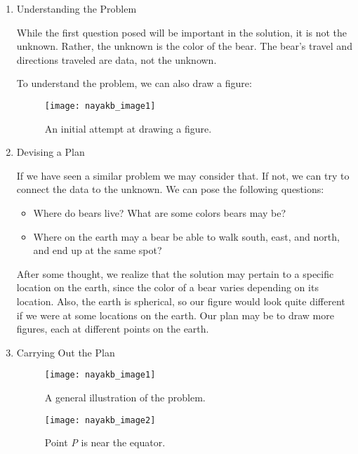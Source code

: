 \begin{enumerate}
   \item Understanding the Problem
  
   While the first question posed will be important in the solution, it is not the unknown. Rather, the unknown is the color of the bear. The bear’s travel and directions traveled are data, not the unknown.
   
   To understand the problem, we can also draw a figure:
   
   \vspace{1cm}
   
   \renewcommand{\thefigure}{1}
   \begin{figure}[htp]
    \centering
    \begin{minipage}{6cm}
    \texttt{[image: nayakb\_image1]}
    \caption{An initial attempt at drawing a figure.}
    \label{fig:1}
    \end{minipage}
\end{figure}

\pagebreak
   \item Devising a Plan
   
   If we have seen a similar problem we may consider that. If not, we can try to connect the data to the unknown. We can pose the following questions:
   
   \begin{itemize}
     \item Where do bears live? What are some colors bears may be?
     \item Where on the earth may a bear be able to walk south, east, and north, and end up at the same spot?
   \end{itemize}
   
   After some thought, we realize that the solution may pertain to a specific location on the earth, since the color of a bear varies depending on its location. Also, the earth is spherical, so our figure would look quite different if we were at some locations on the earth. Our plan may be to draw more figures, each at different points on the earth.
   
   \item Carrying Out the Plan
   
   \renewcommand{\thefigure}{2}
\begin{figure}[!htb]
   \begin{minipage}{0.48\textwidth}
     \centering
     \texttt{[image: nayakb\_image1]}
     \caption{A general illustration of the problem.}\label{Fig:1}
   \end{minipage}\hfill
   \begin{minipage}{0.48\textwidth}
     \centering
     \renewcommand{\thefigure}{3}
     \texttt{[image: nayakb\_image2]}
     \caption{Point \emph{P} is near the equator.}\label{Fig:2}
   \end{minipage}
\end{figure}


\end{enumerate}
